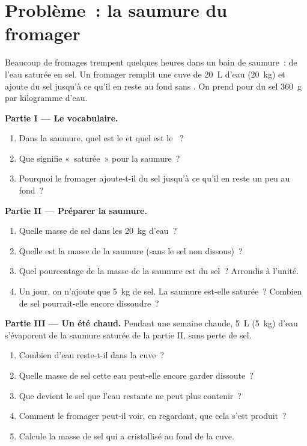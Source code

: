 \section{Problème~: la saumure du fromager}

\begin{problem}
\label{pb:g6:solutions-and-solubility:1}
Beaucoup de fromages trempent quelques heures dans un bain de saumure~:
de l'eau saturée en sel. Un fromager remplit une cuve de \qty{20}{L}
d'eau (\qty{20}{kg}) et ajoute du sel jusqu'à ce qu'il en reste au fond
sans . On prend pour  du sel \qty{360}{g} par
kilogramme d'eau.

\medskip
\noindent\textbf{Partie I --- Le vocabulaire.}
\begin{enumerate}
  \item Dans la saumure, quel est le  et quel est le ~?
  \item Que signifie «~saturée~» pour la saumure~?
  \item Pourquoi le fromager ajoute-t-il du sel jusqu'à ce qu'il en reste
        un peu au fond~?
\end{enumerate}

\medskip
\noindent\textbf{Partie II --- Préparer la saumure.}
\begin{enumerate}[resume]
  \item Quelle masse de sel  dans les \qty{20}{kg} d'eau~?
  \item Quelle est la masse de la saumure (sans le sel non dissous)~?
  \item Quel pourcentage de la masse de la saumure est du sel~? Arrondis
        à l'unité.
  \item Un jour, on n'ajoute que \qty{5}{kg} de sel. La saumure est-elle
        saturée~? Combien de sel pourrait-elle encore dissoudre~?
\end{enumerate}

\medskip
\noindent\textbf{Partie III --- Un été chaud.}
Pendant une semaine chaude, \qty{5}{L} (\qty{5}{kg}) d'eau s'évaporent
de la saumure saturée de la partie II, sans perte de sel.
\begin{enumerate}[resume]
  \item Combien d'eau reste-t-il dans la cuve~?
  \item Quelle masse de sel cette eau peut-elle encore garder dissoute~?
  \item Que devient le sel que l'eau restante ne peut plus contenir~?
  \item Comment le fromager peut-il voir, en regardant, que cela s'est
        produit~?
  \item Calcule la masse de sel qui a cristallisé au fond de la cuve.
\end{enumerate}
\end{problem}
